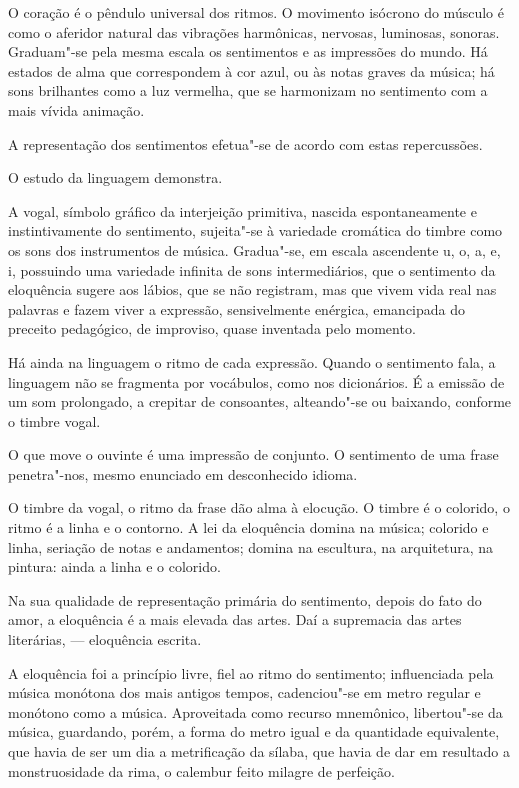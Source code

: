 O coração é o pêndulo universal dos ritmos. O
movimento isócrono do músculo é como o aferidor natural das vibrações
harmônicas, nervosas, luminosas, sonoras. Graduam"-se pela mesma
escala os sentimentos e as impressões do mundo. Há estados de alma que
correspondem à cor azul, ou às notas graves da música; há sons
brilhantes como a luz vermelha, que se harmonizam no sentimento com a
mais vívida animação. 

A representação dos sentimentos efetua"-se de
acordo com estas repercussões. 

O estudo da linguagem demonstra. 

A vogal, símbolo gráfico da interjeição primitiva, nascida
espontaneamente e instintivamente do sentimento, sujeita"-se à
variedade cromática do timbre como os sons dos instrumentos de música.
Gradua"-se, em escala ascendente u, o, a, e, i, possuindo uma
variedade infinita de sons intermediários, que o sentimento da
eloquência sugere aos lábios, que se não registram, mas que vivem vida
real nas palavras e fazem viver a expressão, sensivelmente enérgica,
emancipada do preceito pedagógico, de improviso, quase inventada pelo
momento. 

Há ainda na linguagem o ritmo de cada expressão. Quando o
sentimento fala, a linguagem não se fragmenta por vocábulos, como nos
dicionários. É a emissão de um som prolongado, a crepitar de
consoantes, alteando"-se ou baixando, conforme o timbre vogal. 

O que move o ouvinte é uma impressão de conjunto. O sentimento de uma frase
penetra"-nos, mesmo enunciado em desconhecido idioma. 

O timbre da vogal, o ritmo da frase dão alma à elocução. O timbre é o colorido, o
ritmo é a linha e o contorno. A lei da eloquência domina na música;
colorido e linha, seriação de notas e andamentos; domina na escultura,
na arquitetura, na pintura: ainda a linha e o colorido. 

Na sua qualidade de representação primária do sentimento, depois do fato do
amor, a eloquência é a mais elevada das artes. Daí a supremacia das
artes literárias, --- eloquência escrita. 

A eloquência foi a princípio
livre, fiel ao ritmo do sentimento; influenciada pela música monótona
dos mais antigos tempos, cadenciou"-se em metro regular e monótono
como a música. Aproveitada como recurso mnemônico, libertou"-se da
música, guardando, porém, a forma do metro igual e da quantidade
equivalente, que havia de ser um dia a metrificação da sílaba, que
havia de dar em resultado a monstruosidade da rima, o calembur feito
milagre de perfeição. 

